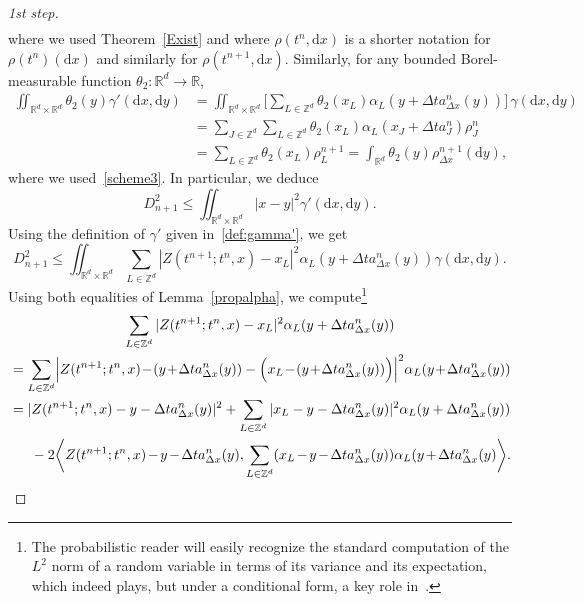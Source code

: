\documentclass[11pt]{article}
\theoremstyle{definition}
\numberwithin{equation}{section}
\newcommand*{\dd}{\mathrm{d}}
\newcommand*{\dx}{\dd x}
\newcommand*{\dy}{\dd y}
\newcommand*\RR{\mathbb{R}}
\newcommand*\ZZ{\mathbb{Z}}
\newenvironment{step}[1]{\begin{proof}[#1]}{\let\qed\relax \end{proof}}
\newcommand*{\Mk}{\mkern -2mu}
\begin{document}
\begin{step}{1st step}
\begin{align*}
\end{align*}
where we used Theorem~\ref{Exist} and where $\rho(t^n,\dx)$ is a shorter notation for $\rho(t^n)(\dx)$ and similarly for $\rho(t^{n+1},\dx)$. Similarly, for any bounded Borel-measurable function $\theta_{2} : \RR^d \rightarrow \RR$,
\begin{align*}
\iint_{\RR^d\times\RR^d} \theta_{2}(y) \gamma'(\dx,\dy) & = \iint_{\RR^d\times\RR^d}
\biggl[\sum_{L\in \ZZ^d} \theta_{2}(x_L) \alpha_L(y+\Delta t a^n_{\Delta x}(y))\biggr]\,\gamma(\dx,\dy) \\
& = \sum_{J\in \ZZ^d}\sum_{L\in \ZZ^d} \theta_{2}(x_L) \alpha_L(x_J+\Delta t a_J^n) \rho_J^n \\
& = \sum_{L\in \ZZ^d} \theta_{2}(x_L) \rho_L^{n+1} = \int_{\RR^d} \theta_{2}(y) \rho^{n+1}_{\Delta x}(\dy),
\end{align*}
where we used~\eqref{scheme3}. In particular, we deduce
\[
D_{n+1}^2 \leq \iint_{\RR^d\times\RR^d} |x-y|^2 \gamma'(\dx,\dy).
\]
Using the definition of $\gamma'$ given in~\eqref{def:gamma'}, we get
\begin{equation}\label{eq1}
D_{n+1}^2 \leq \iint_{\RR^d\times\RR^d} \sum_{L\in \ZZ^d} |Z(t^{n+1};t^n,x)-x_L|^2 \alpha_L (y+\Delta t a^n_{\Delta x}(y)) \gamma(\dx,\dy).
\end{equation}
Using both equalities of Lemma~\ref{propalpha}, we compute\footnote{The probabilistic reader will easily recognize the standard computation of the $L^2$ norm of a random variable in terms of its variance and its expectation, which indeed plays, but under a conditional form, a key role in~\cite{DLV}.}
\begin{multline}\label{eqZz}
\sum_{L\in \ZZ^d}|Z(t^{n+1};t^n,x) - x_L|^2 \alpha_L(y+\Delta t a^n_{\Delta x}(y)) \\
\begin{aligned}
&= \sum_{L\in \ZZ^d}\Bigl| Z(t^{n+1};t^n,x) \!-\! (y \!+\!\Delta t a^n_{\Delta x}(y)) - \Bigl(x_L \!-\! (y \!+\! \Delta t a^n_{\Delta x}(y)) \Bigr) \Bigr|^2 \alpha_L(y\!+\!\Delta t a^n_{\Delta x}(y)) \\
&= |Z(t^{n+1};t^n,x) - y - \Delta t a^n_{\Delta x}(y) |^2 + \sum_{L\in \ZZ^d} |x_L - y - \Delta t a^n_{\Delta x}(y)|^2 \alpha_L(y+\Delta t a^n_{\Delta x}(y)) \\
&\;\;\quad -2\biggl\langle Z(t^{n+1};t^n,x) \Mk-\Mk y \Mk-\Mk \Delta t a^n_{\Delta x}(y),\sum_{L \in \ZZ^d}
(x_L\Mk-\Mk y\Mk-\Mk\Delta t a^n_{\Delta x}(y)) \alpha_L(y\Mk+\Mk\Delta t a^n_{\Delta x}(y)\biggr\rangle.
\end{aligned}
\end{multline}

\end{step}
\end{document}
